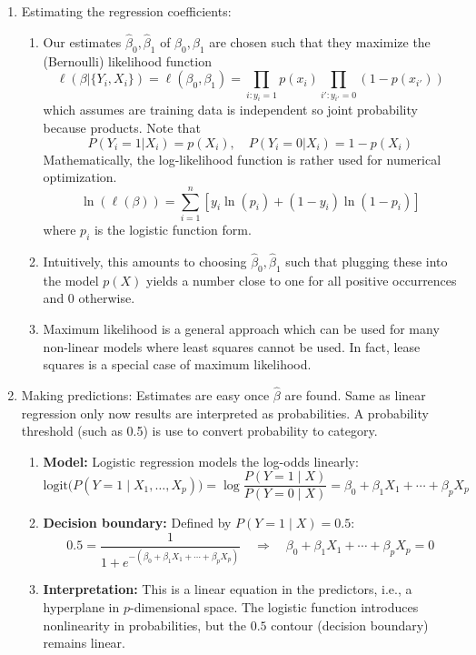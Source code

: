 \documentclass{article}
\begin{document}
\begin{enumerate}
\item Estimating the regression coefficients:
\begin{enumerate}
\item Our estimates $\hat{\beta}_0, \hat{\beta}_1$ of $\beta_0, \beta_1$ are chosen such that they maximize the (Bernoulli) likelihood function
\[
\ell(\beta | \{ Y_i, X_i \}) = \ell(\beta_0, \beta_1) = \prod_{i: y_i=1} p(x_i) \prod_{i' : y_{i'}=0} (1-p(x_{i'}))
\]
which assumes are training data is independent so joint probability because products. Note that
\[
P(Y_i=1 | X_i) = p(X_i), \quad P(Y_i=0 | X_i) = 1-p(X_i)
\]
Mathematically, the log-likelihood function is rather used for numerical optimization.
\[
\ln(\ell(\beta)) = \sum_{i=1}^n \left[ y_i \ln(p_i) + (1-y_i)\ln(1-p_i) \right]
\]
where $p_i$ is the logistic function form.
\item Intuitively, this amounts to choosing $\hat{\beta}_0, \hat{\beta}_1$ such that plugging these into the model $p(X)$ yields a number close to one for all positive occurrences and 0 otherwise.
\item Maximum likelihood is a general approach which can be used for many non-linear models where least squares cannot be used. In fact, lease squares is a special case of maximum likelihood.
\end{enumerate}

\item Making predictions: Estimates are easy once $\hat{\beta}$ are found. Same as linear regression only now results are interpreted as probabilities. A probability threshold (such as 0.5) is use to convert probability to category.
\begin{enumerate}
    \item \textbf{Model:} Logistic regression models the log-odds linearly:
    \[
        \text{logit}\big(P(Y=1 \mid X_1, \dots, X_p)\big) = \log \frac{P(Y=1 \mid X)}{P(Y=0 \mid X)} = \beta_0 + \beta_1 X_1 + \cdots + \beta_p X_p
    \]
    
    \item \textbf{Decision boundary:} Defined by $P(Y=1 \mid X) = 0.5$:
    \[
        0.5 = \frac{1}{1 + e^{-(\beta_0 + \beta_1 X_1 + \cdots + \beta_p X_p)}} 
        \quad \Rightarrow \quad
        \beta_0 + \beta_1 X_1 + \cdots + \beta_p X_p = 0
    \]
    
    \item \textbf{Interpretation:} This is a linear equation in the predictors, i.e., a hyperplane in $p$-dimensional space. The logistic function introduces nonlinearity in probabilities, but the $0.5$ contour (decision boundary) remains linear.
    

\end{enumerate}
\end{enumerate}
\end{document}
